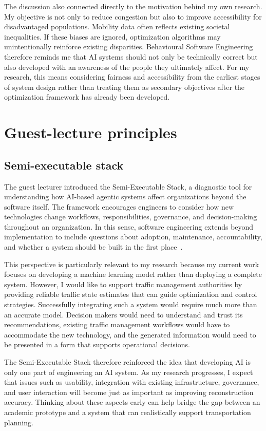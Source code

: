 \documentclass{article}
\begin{document}
The discussion also connected directly to the motivation behind my own research. 
My objective is not only to reduce congestion but also to improve accessibility for disadvantaged populations. 
Mobility data often reflects existing societal inequalities. 
If these biases are ignored, optimization algorithms may unintentionally reinforce existing disparities. 
Behavioural Software Engineering therefore reminds me that AI systems should not only be technically correct but also developed with an awareness of the people they ultimately affect. 
For my research, this means considering fairness and accessibility from the earliest stages of system design rather than treating them as secondary objectives after the optimization framework has already been developed.

\section{Guest-lecture principles}
\subsection{Semi-executable stack}

The guest lecturer introduced the Semi-Executable Stack, a diagnostic tool for understanding how AI-based agentic systems affect organizations beyond the software itself. 
The framework encourages engineers to consider how new technologies change workflows, responsibilities, governance, and decision-making throughout an organization. 
In this sense, software engineering extends beyond implementation to include questions about adoption, maintenance, accountability, and whether a system should be built in the first place~\cite{Feldt2026}. 

This perspective is particularly relevant to my research because my current work focuses on developing a machine learning model rather than deploying a complete system. 
However, I would like to support traffic management authorities by providing reliable traffic state estimates that can guide optimization and control strategies. 
Successfully integrating such a system would require much more than an accurate model. 
Decision makers would need to understand and trust its recommendations, existing traffic management workflows would have to accommodate the new technology, and the generated information would need to be presented in a form that supports operational decisions. 

The Semi-Executable Stack therefore reinforced the idea that developing AI is only one part of engineering an AI system. 
As my research progresses, I expect that issues such as usability, integration with existing infrastructure, governance, and user interaction will become just as important as improving reconstruction accuracy. Thinking about these aspects early can help bridge the gap between an academic prototype and a system that can realistically support transportation planning.
\end{document}
